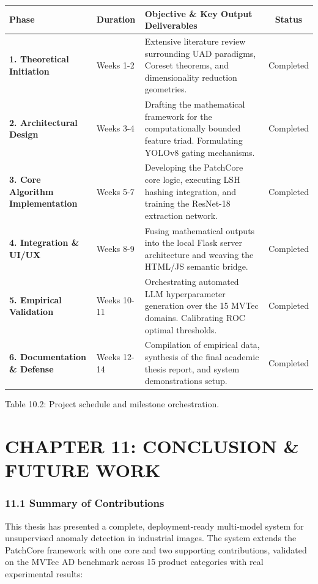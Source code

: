 \documentclass[12pt, a4paper, oneside]{report}
\begin{document}
{\def\LTcaptype{none} %
\begin{longtable}[]{@{}lllc@{}}
\toprule\noalign{}
Phase & Duration & Objective \& Key Output Deliverables & Status \\
\midrule\noalign{}
\endhead
\bottomrule\noalign{}
\endlastfoot
\textbf{1. Theoretical Initiation} & Weeks 1-2 & Extensive literature review surrounding UAD paradigms, Coreset theorems, and dimensionality reduction geometries. & Completed \\
\textbf{2. Architectural Design} & Weeks 3-4 & Drafting the mathematical framework for the computationally bounded feature triad. Formulating YOLOv8 gating mechanisms. & Completed \\
\textbf{3. Core Algorithm Implementation} & Weeks 5-7 & Developing the PatchCore core logic, executing LSH hashing integration, and training the ResNet-18 extraction network. & Completed \\
\textbf{4. Integration \& UI/UX} & Weeks 8-9 & Fusing mathematical outputs into the local Flask server architecture and weaving the HTML/JS semantic bridge. & Completed \\
\textbf{5. Empirical Validation} & Weeks 10-11 & Orchestrating automated LLM hyperparameter generation over the 15 MVTec domains. Calibrating ROC optimal thresholds. & Completed \\
\textbf{6. Documentation \& Defense} & Weeks 12-14 & Compilation of empirical data, synthesis of the final academic thesis report, and system demonstrations setup. & Completed \\
\end{longtable}
}

Table 10.2: Project schedule and milestone orchestration.

\bigskip\noindent\hrulefill\bigskip

\chapter{CHAPTER 11: CONCLUSION \& FUTURE WORK}\label{chapter-11-conclusion-future-work}

\subsection{11.1 Summary of Contributions}\label{summary-of-contributions}

This thesis has presented a complete, deployment-ready multi-model system for unsupervised anomaly detection in industrial images. The system extends the PatchCore framework with one core and two supporting contributions, validated on the MVTec AD benchmark across 15 product categories with real experimental results:
\end{document}
